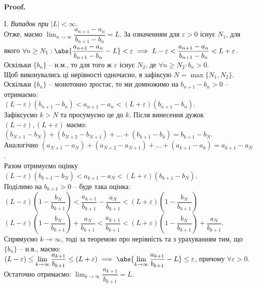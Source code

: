 \documentclass[a4paper, 14pt]{article}
\makeatletter
\def\qed{$\blacksquare$}
\theoremstyle{theoremdd}
\theoremstyle{theoremdd}
\theoremstyle{theoremdd}
\theoremstyle{theoremdd}
\theoremstyle{theoremdd}
\theoremstyle{theoremdd}
\theoremstyle{theoremdd}
\theoremstyle{theoremdd}
\renewenvironment{proof}[1][Proof.\\]{\par
\pushQED{\hfill \qed}%
\normalfont \topsep6\p@\@plus6\p@\relax
\trivlist
\item\relax
{\bfseries
#1\@addpunct{.}}\hspace\labelsep\ignorespaces
}{%
\popQED\endtrivlist\@endpefalse
}
\makeatother
\begin{document}
	\begin{proof}
	I. \textit{Випадок при $|L| < \infty$}.\\
	Отже, маємо $\displaystyle \lim_{n \to \infty} \dfrac{a_{n+1} - a_n}{b_{n+1} - b_n} = L$. За означенням для $\varepsilon > 0$ існує $N_1$, для якого $\forall n \geq N_1: \abs{\dfrac{a_{n+1}-a_n}{b_{n+1}-b_n} - L} < \varepsilon \implies L - \varepsilon < \dfrac{a_{n+1} - a_n}{b_{n+1} - b_n} < L + \varepsilon$.\\
	Оскільки $\{b_n\}$ -- н.м., то для того ж $\varepsilon$ існує $N_2$, де $\forall n \geq N_2: b_n > 0$.\\
	Щоб виконувались ці нерівності одночасно, я зафіксую $N = \max \{N_1, N_2\}$.\\
	Оскільки $\{b_n\}$ -- монотонно зростає, то ми домножимо на $b_{n+1} - b_n > 0$ -- отримаємо:\\
	$(L - \varepsilon)(b_{n+1} - b_n) < a_{n+1} - a_n < (L + \varepsilon)(b_{n+1} - b_n)$.\\
	Зафіксуємо $k > N$ та просумуємо це до $k$. Після винесення дужок $(L-\varepsilon), (L+\varepsilon)$ маємо: \\
	$(b_{N+1} - b_N) + (b_{N+2} - b_{N+1}) + \dots + (b_{k+1} - b_{k}) = b_{k+1} - b_N$.\\
	Аналогічно $(a_{N+1} - a_N) + (a_{N+2} - a_{N+1}) + \dots + (a_{k+1} - a_{k}) = a_{k+1} - a_N$.\\
	Разом отримуємо оцінку $(L - \varepsilon)(b_{k+1} - b_N) < a_{k+1} - a_N < (L + \varepsilon)(b_{k+1} - b_N)$.\\
	Поділимо на $b_{k+1} > 0$ -- буде така оцінка:\\
	$(L - \varepsilon) \left(1 - \dfrac{b_N}{b_{k+1}} \right) < \dfrac{a_{k+1}}{b_{k+1}} - \dfrac{a_N}{b_{k+1}} < (L + \varepsilon) \left(1 - \dfrac{b_N}{b_{k+1}} \right)$\\
	$(L - \varepsilon) \left(1 - \dfrac{b_N}{b_{k+1}} \right) + \dfrac{a_N}{b_{k+1}}  < \dfrac{a_{k+1}}{b_{k+1}} < (L + \varepsilon) \left(1 - \dfrac{b_N}{b_{k+1}} \right) + \dfrac{a_N}{b_{k+1}}$.\\
	Спрямуємо $k \to \infty$, тоді за теоремою про нерівність та з урахуванням тим, що $\{b_n\}$ -- н.в., маємо:\\
	$(L-\varepsilon) \leq \displaystyle \lim_{k \to \infty} \dfrac{a_{k+1}}{b_{k+1}} \leq (L + \varepsilon) \implies \abs{\displaystyle \lim_{k \to \infty} \dfrac{a_{k+1}}{b_{k+1}} - L} \leq \varepsilon$, причому $\forall \varepsilon > 0$.\\
	Остаточно отримаємо: $\displaystyle \lim_{k \to \infty} \dfrac{a_{k+1}}{b_{k+1}} = L$.

\end{proof}
\end{document}
